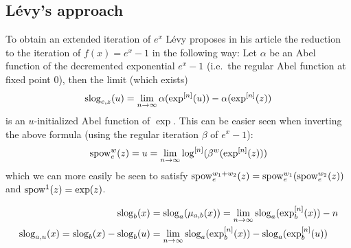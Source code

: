 \documentclass{article}
\numberwithin{equation}{section}
\begin{document}
\subsection{Lévy's approach}
To obtain an extended iteration of $e^x$ Lévy proposes in his article
\cite{levy:exponentielle} the reduction to the iteration of
$f(x)=e^x-1$ in the following way: Let $\alpha$ be an Abel
function of the decremented exponential $e^x -1$ (i.e.\ the regular
Abel function at fixed point 0), then the limit
(which exists)
\begin{align*}
  \operatorname{slog}_{e,z}(u) = \lim_{n\to\infty} \alpha(\exp^{[n]}(u)) -\alpha(\exp^{[n]}(z))
\end{align*}
is an $u$-initialized Abel function of $\exp$. This can be easier seen
when inverting the above formula (using the regular iteration $\beta$ of
$e^x-1$):
\begin{align*}
  \operatorname{spow}_e^w(z) = u = \lim_{n\to\infty} \log^{[n]}(\beta^{w}(\exp^{[n]}(z)))
\end{align*}
which we can more easily be seen to satisfy
$\operatorname{spow}^{w_1+w_2}_e(z)=\operatorname{spow}^{w_1}_e(\operatorname{spow}^{w_2}_e(z))$ and
$\operatorname{spow}^{1}(z)=\exp(z)$.

\begin{align*}
  \operatorname{slog}_b(x)&=\operatorname{slog}_a(\mu_{a,b}(x)) = \lim_{n\to\infty} \operatorname{slog}_a(\exp_b^{[n]}(x)) - n\\
  \operatorname{slog}_{a,u}(x)=\operatorname{slog}_b(x)-\operatorname{slog}_b(u)&= \lim_{n\to\infty}
  \operatorname{slog}_a(\exp_b^{[n]}(x))-\operatorname{slog}_a(\exp_b^{[n]}(u))
\end{align*}
 
\end{document}
